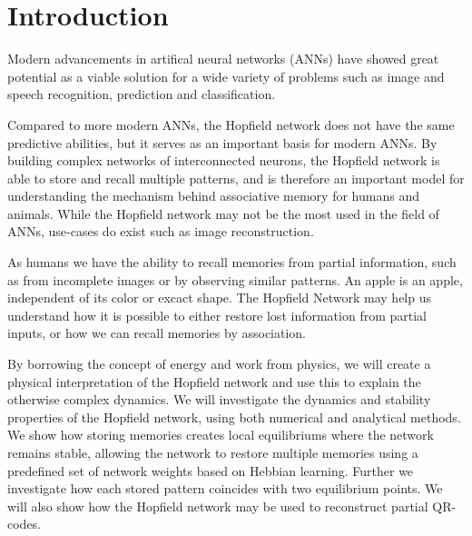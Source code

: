 \section{Introduction}
Modern advancements in artifical neural networks (ANNs) have showed great potential as a viable solution for a wide variety of problems such as image and speech recognition, prediction and classification. 

Compared to more modern ANNs, the Hopfield network does not have the same predictive abilities, but it serves as an important basis for modern ANNs. By building complex networks of interconnected neurons, the Hopfield network is able to store and recall multiple patterns, and is therefore an important model for understanding the mechanism behind associative memory for humans and animals. While the Hopfield network may not be the most used in the field of ANNs, use-cases do exist such as image reconstruction. 

As humans we have the ability to recall memories from partial information, such as from incomplete images or by observing similar patterns. An apple is an apple, independent of its color or excact shape. The Hopfield Network may help us understand how it is possible to either restore lost information from partial inputs, or how we can recall memories by association.

By borrowing the concept of energy and work from physics, we will create a physical interpretation of the Hopfield network and use this to explain the otherwise complex dynamics. We will investigate the dynamics and stability properties of the Hopfield network, using both numerical and analytical methods. We show how storing memories creates local equilibriums where the network remains stable, allowing the network to restore multiple memories using a predefined set of network weights based on Hebbian learning. Further we investigate how each stored pattern coincides with two equilibrium points. We will also show how the Hopfield network may be used to reconstruct partial QR-codes.